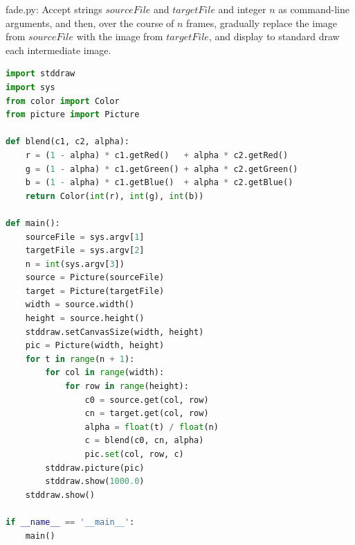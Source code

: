 \documentclass[8pt,a4paper,compress]{beamer}
\begin{document}
\begin{frame}[fragile]
\pause

\begin{framed}
\tiny fade.py: Accept strings $sourceFile$ and $targetFile$ and integer $n$ as command-line arguments, and then, over the course of $n$ frames, gradually replace the image from $sourceFile$ with the image from $targetFile$, and display to standard draw each intermediate image. 
\end{framed}

\begin{lstlisting}[language=Python,style=focusin]
import stddraw
import sys
from color import Color
from picture import Picture

def blend(c1, c2, alpha):
    r = (1 - alpha) * c1.getRed()   + alpha * c2.getRed()
    g = (1 - alpha) * c1.getGreen() + alpha * c2.getGreen()
    b = (1 - alpha) * c1.getBlue()  + alpha * c2.getBlue()
    return Color(int(r), int(g), int(b))

def main():
    sourceFile = sys.argv[1]
    targetFile = sys.argv[2]
    n = int(sys.argv[3])
    source = Picture(sourceFile)
    target = Picture(targetFile)
    width = source.width()
    height = source.height()
    stddraw.setCanvasSize(width, height)
    pic = Picture(width, height)
    for t in range(n + 1):
        for col in range(width):
            for row in range(height):
                c0 = source.get(col, row)
                cn = target.get(col, row)
                alpha = float(t) / float(n)
                c = blend(c0, cn, alpha)
                pic.set(col, row, c)
        stddraw.picture(pic)
        stddraw.show(1000.0)
    stddraw.show()

if __name__ == '__main__':
    main()
\end{lstlisting}
\end{frame}
\end{document}
